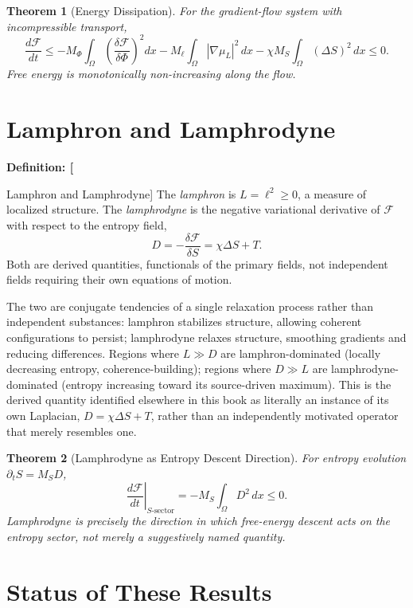 \documentclass[11pt,fleqn]{book}
\numberwithin{equation}{chapter}
\newenvironment{definition}[1]
  {\begin{definitionEnv}
   \noindent\textbf{Definition: #1}\par\smallskip}
  {\end{definitionEnv}}
\theoremstyle{plain}
\newtheorem{theorem}{Theorem}[chapter]
\theoremstyle{definition}
\theoremstyle{remark}
\begin{document}
\begin{theorem}[Energy Dissipation]
For the gradient-flow system with incompressible transport,
\[
\frac{d\mathcal F}{dt} \leq -M_\Phi\int_\Omega \left(\frac{\delta\mathcal F}{\delta\Phi}\right)^2 dx - M_\ell\int_\Omega |\nabla\mu_L|^2\,dx - \chi M_S \int_\Omega (\Delta S)^2\,dx \leq 0.
\]
Free energy is monotonically non-increasing along the flow.
\end{theorem}

\section{Lamphron and Lamphrodyne}

\begin{definition}[Lamphron and Lamphrodyne]
The \emph{lamphron} is \(L=\ell^2\geq 0\), a measure of localized structure. The \emph{lamphrodyne} is the negative variational derivative of \(\mathcal F\) with respect to the entropy field,
\[
D = -\frac{\delta\mathcal F}{\delta S} = \chi\Delta S + T.
\]
Both are derived quantities, functionals of the primary fields, not independent fields requiring their own equations of motion.
\end{definition}

The two are conjugate tendencies of a single relaxation process rather than independent substances: lamphron stabilizes structure, allowing coherent configurations to persist; lamphrodyne relaxes structure, smoothing gradients and reducing differences. Regions where \(L\gg D\) are lamphron-dominated (locally decreasing entropy, coherence-building); regions where \(D\gg L\) are lamphrodyne-dominated (entropy increasing toward its source-driven maximum). This is the derived quantity identified elsewhere in this book as literally an instance of its own Laplacian, \(D=\chi\Delta S+T\), rather than an independently motivated operator that merely resembles one.

\begin{theorem}[Lamphrodyne as Entropy Descent Direction]
For entropy evolution \(\partial_t S = M_S D\),
\[
\left.\frac{d\mathcal F}{dt}\right|_{S\text{-sector}} = -M_S\int_\Omega D^2\,dx \leq 0.
\]
Lamphrodyne is precisely the direction in which free-energy descent acts on the entropy sector, not merely a suggestively named quantity.
\end{theorem}

\section{Status of These Results}
\end{document}

